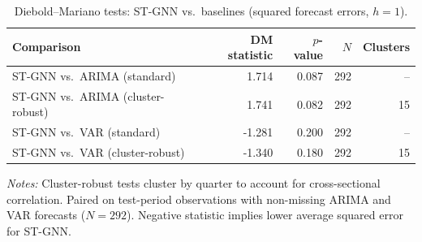\begin{table}[ht]
  \centering
  \caption{Diebold--Mariano tests: ST-GNN vs.\ baselines (squared forecast errors, $h=1$).}
  \label{tab:dm}
  \begin{tabular}{lrrrr}
    \toprule
    Comparison & DM statistic & $p$-value & $N$ & Clusters \\
    \midrule
    ST-GNN vs.\ ARIMA (standard) & 1.714 & 0.087 & 292 & -- \\
    ST-GNN vs.\ ARIMA (cluster-robust) & 1.741 & 0.082 & 292 & 15 \\
    ST-GNN vs.\ VAR (standard) & -1.281 & 0.200 & 292 & -- \\
    ST-GNN vs.\ VAR (cluster-robust) & -1.340 & 0.180 & 292 & 15 \\
    \bottomrule
  \end{tabular}
  \vspace{0.5em}
  \begin{minipage}{\linewidth}
    \footnotesize
    \textit{Notes:} Cluster-robust tests cluster by quarter to account for cross-sectional correlation.
    Paired on test-period observations with non-missing ARIMA and VAR forecasts ($N=292$).
    Negative statistic implies lower average squared error for ST-GNN.
  \end{minipage}
\end{table}